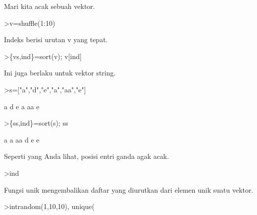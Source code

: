 \documentclass[a4paper,10pt]{article}
\begin{document}
\begin{eulernotebook}
\begin{eulercomment}
\begin{eulercomment}
\begin{eulercomment}
\begin{eulercomment}
\begin{eulercomment}
\begin{eulercomment}
\begin{eulercomment}
Mari kita acak sebuah vektor.
\end{eulercomment}
\begin{eulerprompt}
>v=shuffle(1:10)
\end{eulerprompt}
\begin{euleroutput}
  [4,  5,  10,  6,  8,  9,  1,  7,  2,  3]
\end{euleroutput}
\begin{eulercomment}
Indeks berisi urutan v yang tepat.
\end{eulercomment}
\begin{eulerprompt}
>\{vs,ind\}=sort(v); v[ind]
\end{eulerprompt}
\begin{euleroutput}
  [1,  2,  3,  4,  5,  6,  7,  8,  9,  10]
\end{euleroutput}
\begin{eulercomment}
Ini juga berlaku untuk vektor string.
\end{eulercomment}
\begin{eulerprompt}
>s=["a","d","e","a","aa","e"]
\end{eulerprompt}
\begin{euleroutput}
  a
  d
  e
  a
  aa
  e
\end{euleroutput}
\begin{eulerprompt}
>\{ss,ind\}=sort(s); ss
\end{eulerprompt}
\begin{euleroutput}
  a
  a
  aa
  d
  e
  e
\end{euleroutput}
\begin{eulercomment}
Seperti yang Anda lihat, posisi entri ganda agak acak.
\end{eulercomment}
\begin{eulerprompt}
>ind
\end{eulerprompt}
\begin{euleroutput}
  [4,  1,  5,  2,  6,  3]
\end{euleroutput}
\begin{eulercomment}
Fungsi unik mengembalikan daftar yang diurutkan dari elemen unik suatu
vektor.
\end{eulercomment}
\begin{eulerprompt}
>intrandom(1,10,10), unique(%
\end{eulerprompt}
\begin{euleroutput}
  [4,  4,  9,  2,  6,  5,  10,  6,  5,  1]
  [1,  2,  4,  5,  6,  9,  10]
\end{euleroutput}
\begin{eulercomment}

\end{eulercomment}
\end{eulercomment}
\end{eulercomment}
\end{eulercomment}
\end{eulercomment}
\end{eulercomment}
\end{eulercomment}
\end{eulernotebook}
\end{document}
